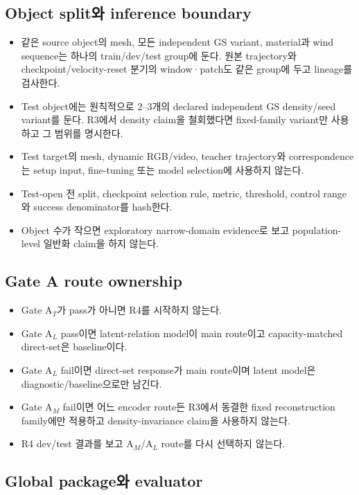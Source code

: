 \documentclass[10pt,a4paper]{article}
\begin{document}
\subsection{Object split와 inference boundary}

\begin{itemize}
  \item 같은 source object의 mesh, 모든 independent GS variant, material과 wind sequence는
  하나의 train/dev/test group에 둔다.
  원본 trajectory와 checkpoint/velocity-reset 분기의 window·patch도 같은 group에 두고 lineage를 검사한다.
  \item Test object에는 원칙적으로 2--3개의 declared independent GS density/seed variant를 둔다.
  R3에서 density claim을 철회했다면 fixed-family variant만 사용하고 그 범위를 명시한다.
  \item Test target의 mesh, dynamic RGB/video, teacher trajectory와 correspondence는 setup input,
  fine-tuning 또는 model selection에 사용하지 않는다.
  \item Test-open 전 split, checkpoint selection rule, metric, threshold, control range와 success denominator를 hash한다.
  \item Object 수가 작으면 exploratory narrow-domain evidence로 보고 population-level 일반화 claim을 하지 않는다.
\end{itemize}

\subsection{Gate A route ownership}

\begin{itemize}
  \item Gate A\(_T\)가 pass가 아니면 R4를 시작하지 않는다.
  \item Gate A\(_L\) pass이면 latent-relation model이 main route이고 capacity-matched direct-set은 baseline이다.
  \item Gate A\(_L\) fail이면 direct-set response가 main route이며 latent model은 diagnostic/baseline으로만 남긴다.
  \item Gate A\(_M\) fail이면 어느 encoder route든 R3에서 동결한 fixed reconstruction family에만 적용하고
  density-invariance claim을 사용하지 않는다.
  \item R4 dev/test 결과를 보고 A\(_M\)/A\(_L\) route를 다시 선택하지 않는다.
\end{itemize}

\subsection{Global package와 evaluator}
\end{document}
